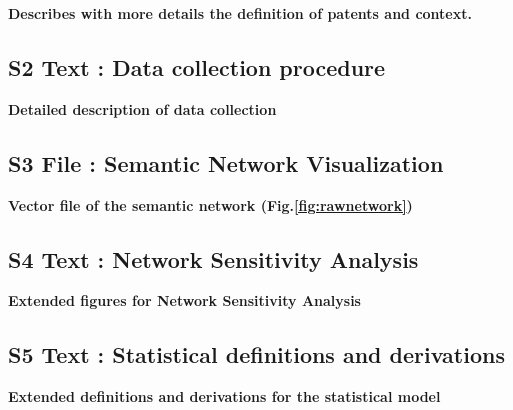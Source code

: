 \documentclass[10pt,A4,draft]{article}
\begin{document}
\textbf{Describes with more details the definition of patents and  context.}

\subsection*{S2 Text : Data collection procedure}

\textbf{Detailed description of data collection}

\subsection*{S3 File : Semantic Network Visualization}

\textbf{Vector file of the semantic network (Fig.\ref{fig:rawnetwork})}


\subsection*{S4 Text : Network Sensitivity Analysis\label{app:sensitivity}}

\textbf{Extended figures for Network Sensitivity Analysis}

\subsection*{S5 Text : Statistical definitions and derivations}

\textbf{Extended definitions and derivations for the statistical model}








\nolinenumbers

%
%
% 

%
%
\end{document}
